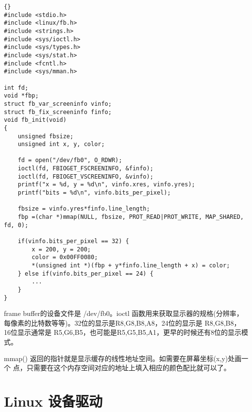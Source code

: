 \documentclass[nofonts]{ctexart}
\begin{document}
\begin{lstlisting}[caption={[清单]fbinit.c},label=fb]{}
#include <stdio.h>
#include <linux/fb.h>
#include <strings.h>
#include <sys/ioctl.h>
#include <sys/types.h>
#include <sys/stat.h>
#include <fcntl.h>
#include <sys/mman.h>

int fd;
void *fbp;
struct fb_var_screeninfo vinfo;
struct fb_fix_screeninfo finfo;
void fb_init(void)
{
    unsigned fbsize;
    unsigned int x, y, color;

    fd = open("/dev/fb0", O_RDWR);
    ioctl(fd, FBIOGET_FSCREENINFO, &finfo);
    ioctl(fd, FBIOGET_VSCREENINFO, &vinfo);
    printf("x = %d, y = %d\n", vinfo.xres, vinfo.yres);
    printf("bits = %d\n", vinfo.bits_per_pixel);

    fbsize = vinfo.yres*finfo.line_length;
    fbp =(char *)mmap(NULL, fbsize, PROT_READ|PROT_WRITE, MAP_SHARED, fd, 0);

    if(vinfo.bits_per_pixel == 32) {
        x = 200, y = 200;
        color = 0x00FF0080;
       	*(unsigned int *)(fbp + y*finfo.line_length + x) = color;
    } else if(vinfo.bits_per_pixel == 24) {
        ...
    }
}
\end{lstlisting}

frame buffer的设备文件是 /dev/fb0。ioctl 函数用来获取显示器的规格(分辨率，
每像素的比特数等等)。32位的显示是R8,G8,B8,A8，24位的显示是 R8,G8,B8，
16位显示通常是 R5,G6,B5，也可能是R5,G5,B5,A1，更早的时候还有8位的显示模式。

mmap() 返回的指针就是显示缓存的线性地址空间。如需要在屏幕坐标(x,y)处画一个
点，只需要在这个内存空间对应的地址上填入相应的颜色配比就可以了。

\section{Linux 设备驱动}
\end{document}
